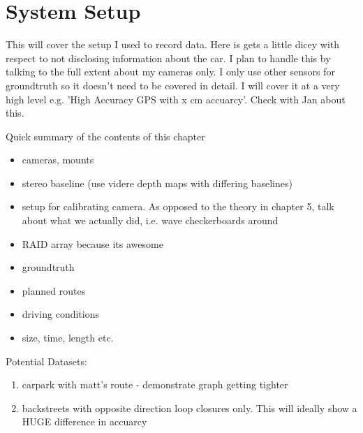\chapter{System Setup}
\label{chapter:system_setup}

This will cover the setup I used to record data.  Here is gets a little dicey with respect to not
disclosing information about the car.  I plan to handle this by talking to the full extent about my
cameras only.  I only use other sensors for groundtruth so it doesn't need to be covered in
detail.  I will cover it at a very high level e.g. 'High Accuracy GPS with x cm accuarcy'.  Check
with Jan about this.

Quick summary of the contents of this chapter

\begin{itemize}
 \item cameras, mounts
 \item stereo baseline (use videre depth maps with differing baselines)
 \item setup for calibrating camera.  As opposed to the theory in chapter 5, talk about what we
actually did, i.e. wave checkerboards around
 \item RAID array because its awesome
 \item groundtruth 
 \item planned routes
 \item driving conditions
 \item size, time, length etc.
\end{itemize}

Potential Datasets:
\begin{enumerate}
 \item carpark with matt's route - demonstrate graph getting tighter
 \item backstreets with opposite direction loop closures only.  This will ideally show a HUGE
difference in accuarcy
\end{enumerate}



